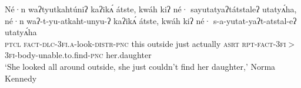 \documentclass[output=paper,colorlinks,citecolor=brown]{langscibook}
\begin{document}

\ea\label{oneida:lexicalized a} 
	\glll Né·n waʔtyutkahtúniʔ kaʔikʌ́ átste, kwáh kiʔ né· sayutatyaʔtátstaleʔ utatyʌ́ha,\\
	né·n waʔ-t-yu-atkaht-unyu-ʔ kaʔikʌ́ átste, kwáh kiʔ né· s-a-yutat-yaʔt-atstal-eʔ utatyʌ́ha\\
	\textsc{ptcl} \textsc{fact-dlc-3fi.a}-look-\textsc{distr-pnc} this outside just actually \textsc{asrt} \textsc{rpt-fact-3fi$>$3fi}-body-unable.to.find-\textsc{pnc} {her.daughter} \\
	\glt `She looked all around outside, she just couldn't find her daughter,' Norma Kennedy \citep[52 (23)]{MichelsonEtAl2016}
\z
\end{document}
